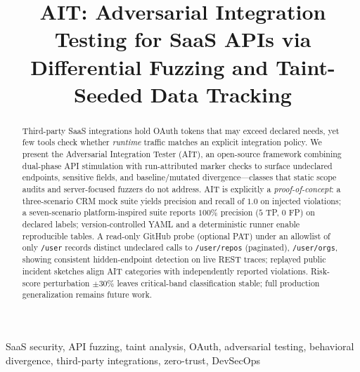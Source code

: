 \documentclass[conference]{IEEEtran}
\begin{document}
\title{AIT: Adversarial Integration Testing for SaaS APIs via
Differential Fuzzing and Taint-Seeded Data Tracking}

\author{
}

\maketitle

\begin{abstract}
Third-party SaaS integrations hold OAuth tokens that may exceed declared
needs, yet few tools check whether \emph{runtime} traffic matches an
explicit integration policy. We present the Adversarial Integration
Tester (AIT), an open-source framework combining dual-phase API
stimulation with run-attributed marker checks to surface undeclared
endpoints, sensitive fields, and baseline/mutated divergence---classes
that static scope audits and server-focused fuzzers do not address.
AIT is explicitly a \emph{proof-of-concept}: a three-scenario CRM mock
suite yields precision and recall of $1.0$ on injected violations; a
seven-scenario platform-inspired suite reports $100\%$ precision ($5$
TP, $0$ FP) on declared labels; version-controlled YAML and a
deterministic runner enable reproducible tables. A read-only GitHub probe
(optional PAT) under an allowlist of only \texttt{/user} records
distinct undeclared calls to \texttt{/user/repos} (paginated),
\texttt{/user/orgs}, showing consistent hidden-endpoint detection on live
REST traces; replayed public incident sketches align AIT categories with
independently reported violations. Risk-score perturbation $\pm30\%$
leaves critical-band classification stable; full production generalization
remains future work.
\end{abstract}

\begin{IEEEkeywords}
SaaS security, API fuzzing, taint analysis, OAuth, adversarial testing,
behavioral divergence, third-party integrations, zero-trust, DevSecOps
\end{IEEEkeywords}
\end{document}
